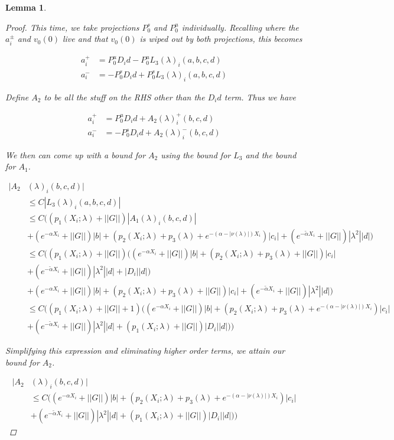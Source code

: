 \documentclass[12pt]{article}
\newtheorem{lemma}{Lemma}
\begin{document}
\begin{lemma}
\begin{proof}
This time, we take projections $P^s_0$ and $P^u_0$ individually. Recalling where the $a_i^\pm$ and $v_0(0)$ live and that $v_0(0)$ is wiped out by both projections, this becomes 

\begin{align*}
a_i^+ &= P^u_0 D_i d - P^u_0 L_3(\lambda)_i(a, b, c, d) \\
a_i^- &= -P^s_0 D_i d + P^s_0 L_3(\lambda)_i(a, b, c, d)
\end{align*}

Define $A_2$ to be all the stuff on the RHS other than the $D_i d$ term. Thus we have 

\begin{align*}
a_i^+ &= P^u_0 D_i d + A_2(\lambda)_i^+(b, c, d) \\
a_i^- &= -P^s_0 D_i d + A_2(\lambda)_i^-(b, c, d)
\end{align*}

We then can come up with a bound for $A_2$ using the bound for $L_3$ and the bound for $A_1$.

\begin{align*}
|A_2&(\lambda)_i(b, c, d)| \\
&\leq C |L_3(\lambda)_i(a, b, c, d)| \\
&\leq C \Big( (p_1(X_i; \lambda) + ||G|| )|A_1(\lambda)_i(b, c, d)| \\
&+ (e^{-\alpha X_i} + ||G||)|b| + ( p_2(X_i; \lambda) + p_3(\lambda) + e^{-(\alpha - |\nu(\lambda)|)X_i} )|c_i| + (e^{-\tilde{\alpha} X_i} + ||G||) |\lambda^2| |d| \Big) \\
&\leq C \Big( (p_1(X_i; \lambda) + ||G|| )( (e^{-\alpha X_i} + ||G||)|b| + ( p_2(X_i; \lambda) + p_3(\lambda) + ||G|| )|c_i| \\
&+ (e^{-\tilde{\alpha} X_i} + ||G||) |\lambda^2| |d| + |D_i||d|)  \\
&+ (e^{-\alpha X_i} + ||G||)|b| + ( p_2(X_i; \lambda) + p_3(\lambda) + ||G|| )|c_i| + (e^{-\tilde{\alpha} X_i} + ||G||) |\lambda^2| |d| \Big) \\
&\leq C \Big( (p_1(X_i; \lambda) + ||G|| + 1)((e^{-\alpha X_i} + ||G||)|b| 
+ ( p_2(X_i; \lambda) + p_3(\lambda) + e^{-(\alpha - |\nu(\lambda)|)X_i} )|c_i| \\
&+(e^{-\tilde{\alpha} X_i} + ||G||) |\lambda^2| |d| +(p_1(X_i; \lambda) + ||G|| )|D_i||d|) \Big)
\end{align*}

Simplifying this expression and eliminating higher order terms, we attain our bound for $A_2$.

\begin{align*}
|A_2&(\lambda)_i(b, c, d)| \\
&\leq C \Big( (e^{-\alpha X_i} + ||G||)|b| + ( p_2(X_i; \lambda) + p_3(\lambda) + e^{-(\alpha - |\nu(\lambda)|)X_i} )|c_i| \\
&+ (e^{-\tilde{\alpha} X_i} + ||G||) |\lambda^2| |d| +(p_1(X_i; \lambda) + ||G|| )|D_i||d|) \Big)
\end{align*}

\end{proof}
\end{lemma}
\end{document}
